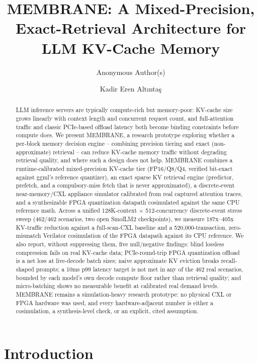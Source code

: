 \documentclass[11pt]{article}
\title{MEMBRANE: A Mixed-Precision, Exact-Retrieval Architecture for LLM KV-Cache Memory}
\author{Anonymous Author(s)}
\author{Kadir Eren Altınta\c{s}}
\date{}
\begin{document}
\maketitle

\begin{abstract}
LLM inference servers are typically compute-rich but memory-poor:
KV-cache size grows linearly with context length and concurrent request
count, and full-attention traffic and classic PCIe-based offload latency
both become binding constraints before compute does. We present
MEMBRANE, a research prototype exploring whether a per-block memory
decision engine -- combining precision tiering and exact
(non-approximate) retrieval -- can reduce KV-cache memory traffic
without degrading retrieval quality, and where such a design does not
help. MEMBRANE combines a runtime-calibrated mixed-precision KV-cache
tier (FP16/Q8/Q4, verified bit-exact against ggml's reference
quantizer), an exact sparse KV retrieval engine (predictor, prefetch,
and a compulsory-miss fetch that is never approximated), a
discrete-event near-memory/CXL appliance simulator calibrated from real
captured attention traces, and a synthesizable FPGA quantization
datapath cosimulated against the same CPU reference math. Across a
unified 128K-context $\times$ 512-concurrency discrete-event stress
sweep (462/462 scenarios, two open SmolLM2 checkpoints), we measure
187x--405x KV-traffic reduction against a full-scan-CXL baseline and a
520{,}000-transaction, zero-mismatch Verilator cosimulation of the FPGA
datapath against its CPU reference. We also report, without suppressing
them, five null/negative findings: blind lossless compression fails on
real KV-cache data; PCIe-round-trip FPGA quantization offload is a net
loss at live-decode batch sizes; naive approximate KV eviction breaks
recall-shaped prompts; a 10ms p99 latency target is not met in any of
the 462 real scenarios, bounded by each model's own decode compute floor
rather than retrieval quality; and micro-batching shows no measurable
benefit at calibrated real demand levels. MEMBRANE remains a
simulation-heavy research prototype: no physical CXL or FPGA hardware
was used, and every hardware-adjacent number is either a cosimulation, a
synthesis-level check, or an explicit, cited assumption.
\end{abstract}

\section{Introduction}
\end{document}
